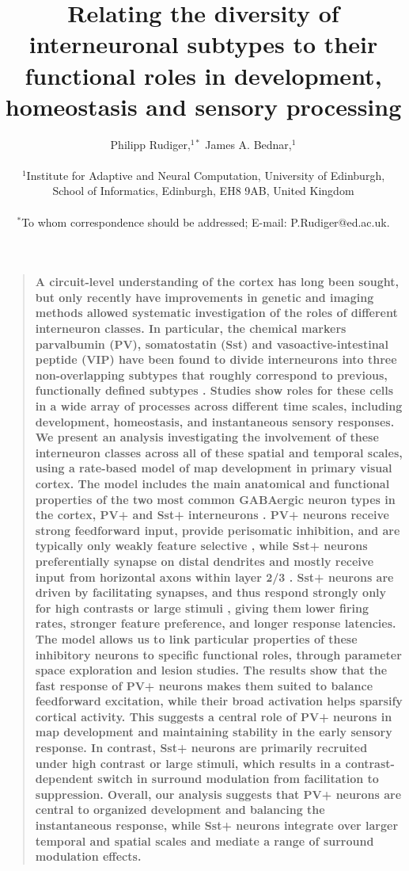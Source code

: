 \documentclass[12pt]{article}
\title{Relating the diversity of interneuronal subtypes to their functional roles in development, homeostasis and sensory processing}
\author
{Philipp Rudiger,$^{1\ast}$ James A. Bednar,$^{1}$\\
\\
\normalsize{$^{1}$Institute for Adaptive and Neural Computation, University of Edinburgh,}\\
\normalsize{School of Informatics, Edinburgh, EH8 9AB, United Kingdom}\\
\\
\normalsize{$^\ast$To whom correspondence should be addressed; E-mail:  P.Rudiger@ed.ac.uk.}
}
\date{}
\newenvironment{sciabstract}{%
\begin{quote} \bf}
{\end{quote}}
\begin{document}
 


\baselineskip24pt


\maketitle 




\begin{sciabstract}
A circuit-level understanding of the cortex has long been sought, but
only recently have improvements in genetic and imaging methods allowed
systematic investigation of the roles of different interneuron
classes. In particular, the chemical markers parvalbumin (PV),
somatostatin (Sst) and vasoactive-intestinal peptide (VIP) have been
found to divide interneurons into three non-overlapping subtypes that
roughly correspond to previous, functionally defined subtypes
\cite{Pfeffer2013}. Studies show roles for these cells in a wide
array of processes across different time scales, including
development, homeostasis, and instantaneous sensory responses. We
present an analysis investigating the involvement of these interneuron
classes across all of these spatial and temporal scales, using a
rate-based model of map development in primary visual cortex. The
model includes the main anatomical and functional properties of the
two most common GABAergic neuron types in the cortex, PV+ and Sst+
interneurons \cite{Pfeffer2013}. PV+ neurons receive strong
feedforward input, provide perisomatic inhibition, and are typically
only weakly feature selective \cite{Hofer2011}, while Sst+ neurons
preferentially synapse on distal dendrites and mostly receive input
from horizontal axons within layer 2/3 \cite{Xu2009}. Sst+ neurons
are driven by facilitating synapses, and thus respond strongly only
for high contrasts or large stimuli \cite{Adesnik2012}, giving them
lower firing rates, stronger feature preference, and longer response
latencies. The model allows us to link particular properties of these
inhibitory neurons to specific functional roles, through parameter
space exploration and lesion studies. The results show that the fast
response of PV+ neurons makes them suited to balance feedforward
excitation, while their broad activation helps sparsify cortical
activity. This suggests a central role of PV+ neurons in map
development and maintaining stability in the early sensory
response. In contrast, Sst+ neurons are primarily recruited under high
contrast or large stimuli, which results in a contrast-dependent
switch in surround modulation from facilitation to
suppression. Overall, our analysis suggests that PV+ neurons are
central to organized development and balancing the instantaneous
response, while Sst+ neurons integrate over larger temporal and
spatial scales and mediate a range of surround modulation effects.
\end{sciabstract}
\end{document}
